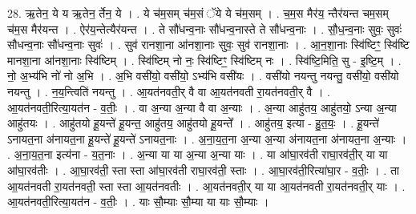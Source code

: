 \documentclass[17pt]{extarticle}
\begin{document}
28. ऋ॒तेन॒ ये य ऋ॒तेन॒ र्तेन॒ ये । . ये च॑म॒सम् च॑म॒सं ॅये ये च॑म॒सम् । . च॒म॒स मैर॑य॒ न्तैर॑यन्त चम॒सम् च॑म॒स मैर॑यन्त । . ऐर॑य॒न्तेत्यैर॑यन्त । . ते सौ॑धन्व॒नाः सौ॑धन्व॒नास्ते ते सौ॑धन्व॒नाः । . सौ॒ध॒न्व॒नाः सुवः॒ सुवः॑ सौधन्व॒नाः सौ॑धन्व॒नाः सुवः॑ । . सुव॑ रानशा॒ना आ॑नशा॒नाः सुवः॒ सुव॑ रानशा॒नाः । . आ॒न॒शा॒नाः स्वि॑ष्टिꣳ॒॒ स्वि॑ष्टि मानशा॒ना आ॑नशा॒नाः स्वि॑ष्टिम् । . स्वि॑ष्टिम् नो नः॒ स्वि॑ष्टिꣳ॒॒ स्वि॑ष्टिम् नः । . स्वि॑ष्टि॒मिति॒ सु - इ॒ष्टि॒म् । . नो॒ अ॒भ्य॑भि नो॑ नो अ॒भि । . अ॒भि वसी॑यो॒ वसी॑यो॒ ऽभ्य॑भि वसी॑यः । . वसी॑यो नयन्तु नयन्तु॒ वसी॑यो॒ वसी॑यो नयन्तु । . न॒य॒न्त्विति॑ नयन्तु । . आ॒यत॑नवती॒र् वै वा आ॒यत॑नवती रा॒यत॑नवती॒र् वै । . आ॒यत॑नवती॒रित्या॒यत॑न - व॒तीः॒ । . वा अ॒न्या अ॒न्या वै वा अ॒न्याः । . अ॒न्या आहु॑तय॒ आहु॑तयो॒ ऽन्या अ॒न्या आहु॑तयः । . आहु॑तयो हू॒यन्ते॑ हू॒यन्त॒ आहु॑तय॒ आहु॑तयो हू॒यन्ते᳚ । . आहु॑तय॒ इत्या - हु॒त॒यः॒ । . हू॒यन्ते॑ ऽनायत॒ना अ॑नायत॒ना हू॒यन्ते॑ हू॒यन्ते॑ ऽनायत॒नाः । . अ॒ना॒य॒त॒ना अ॒न्या अ॒न्या अ॑नायत॒ना अ॑नायत॒ना अ॒न्याः । . अ॒ना॒य॒त॒ना इत्य॑ना - य॒त॒नाः । . अ॒न्या या या अ॒न्या अ॒न्या याः । . या आ॑घा॒रव॑ती राघा॒रव॑ती॒र् या या आ॑घा॒रव॑तीः । . आ॒घा॒रव॑ती॒ स्ता स्ता आ॑घा॒रव॑ती राघा॒रव॑ती॒ स्ताः । . आ॒घा॒रव॑ती॒रित्या॑घा॒र - व॒तीः॒ । . ता आ॒यत॑नवती रा॒यत॑नवती॒ स्ता स्ता आ॒यत॑नवतीः । . आ॒यत॑नवती॒र् या या आ॒यत॑नवती रा॒यत॑नवती॒र् याः । . आ॒यत॑नवती॒रित्या॒यत॑न - व॒तीः॒ । . याः सौ॒म्याः सौ॒म्या या याः सौ॒म्याः । \newline
\end{document}
